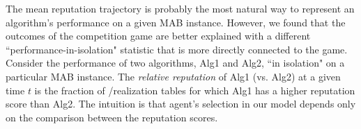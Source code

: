 \documentclass[../competing_bandits.tex]{subfiles}
\begin{document}

The mean reputation trajectory is probably the most natural way to represent an algorithm's performance on a given MAB instance. However, we found that the outcomes of the competition game are better explained with a different ``performance-in-isolation" statistic that is more directly connected to the game. Consider the  performance of two algorithms, Alg1 and Alg2, ``in isolation" on a particular MAB instance. The \emph{relative reputation} of Alg1 (vs. Alg2) at a given time $t$ is the fraction of \MRVs /realization tables for which Alg1 has a higher reputation score than Alg2. The intuition is that agent's selection in our model depends only on the comparison between the reputation scores.
\end{document}
